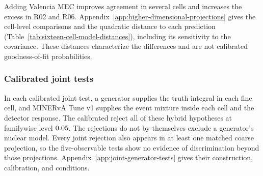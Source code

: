 Adding Valencia MEC improves agreement in several cells and increases the excess in R02 and R06. Appendix~\ref{app:higher-dimensional-projections} gives the cell-level comparisons and the quadratic distance to each prediction (Table~\ref{tab:sixteen-cell-model-distances}), including its sensitivity to the covariance. These distances characterize the differences and are not calibrated goodness-of-fit probabilities.

\subsubsection{Calibrated joint tests}
\label{sec:joint5d}

\label{sec:joint5d-results}\label{sec:joint5d-reading} In each calibrated joint test, a generator supplies the truth integral in each fine cell, and MINERvA Tune v1 supplies the event mixture inside each cell and the detector response. The calibrated \resJoint{} reject all \jtNtests{} of these hybrid hypotheses at familywise level $0.05$. The rejections do not by themselves exclude a generator's nuclear model. Every joint rejection also appears in at least one matched coarse projection, so the five-observable tests show no evidence of discrimination beyond those projections. Appendix~\ref{app:joint-generator-tests} gives their construction, calibration, and conditions.
